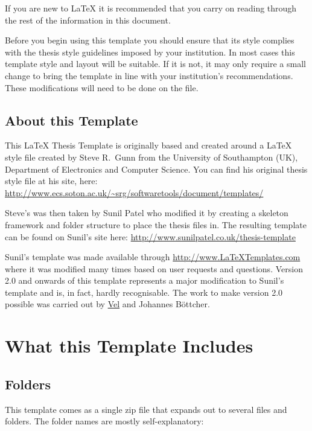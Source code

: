 If you are new to \LaTeX{} it is recommended that you carry on reading through the rest of the information in this document.

Before you begin using this template you should ensure that its style complies with the thesis style guidelines imposed by your institution. In most cases this template style and layout will be suitable. If it is not, it may only require a small change to bring the template in line with your institution's recommendations. These modifications will need to be done on the  file.

\subsection{About this Template}

This \LaTeX{} Thesis Template is originally based and created around a \LaTeX{} style file created by Steve R.\ Gunn from the University of Southampton (UK), Department of Electronics and Computer Science. You can find his original thesis style file at his site, here:
\url{http://www.ecs.soton.ac.uk/~srg/softwaretools/document/templates/}

Steve's  was then taken by Sunil Patel who modified it by creating a skeleton framework and folder structure to place the thesis files in. The resulting template can be found on Sunil's site here:
\url{http://www.sunilpatel.co.uk/thesis-template}

Sunil's template was made available through \url{http://www.LaTeXTemplates.com} where it was modified many times based on user requests and questions. Version 2.0 and onwards of this template represents a major modification to Sunil's template and is, in fact, hardly recognisable. The work to make version 2.0 possible was carried out by \href{mailto:vel@latextemplates.com}{Vel} and Johannes Böttcher.


\section{What this Template Includes}

\subsection{Folders}

This template comes as a single zip file that expands out to several files and folders. The folder names are mostly self-explanatory:

